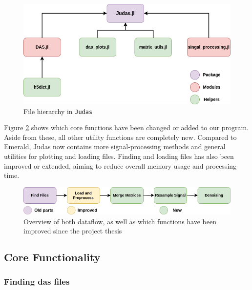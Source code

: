\begin{figure}[!h]
    \centering
    \includegraphics[scale=.5]{figures/judas_overview.png}
    \caption{File hierarchy in \texttt{Judas}}
    \label{fig:judasoverview}
\end{figure}

Figure \ref{fig:apiflow} shows which core functions have been changed or added to our program. Aside from these, all other utility functions are completely new. Compared to Emerald, Judas now contains more signal-processing methods and general utilities for plotting and loading files. Finding and loading files has also been improved or extended, aiming to reduce overall memory usage and processing time. \\
\begin{figure}[!h]
    \centering
    \includegraphics[scale=0.5]{figures/dataflow.png}
    \caption{Overview of both dataflow, as well as which functions have been improved since the project thesis \cite{projthesis}}
    \label{fig:apiflow}
\end{figure}
\subsection{Core Functionality}

\subsubsection{Finding \acrshort{das} files}
\label{met:finddasfiles}

